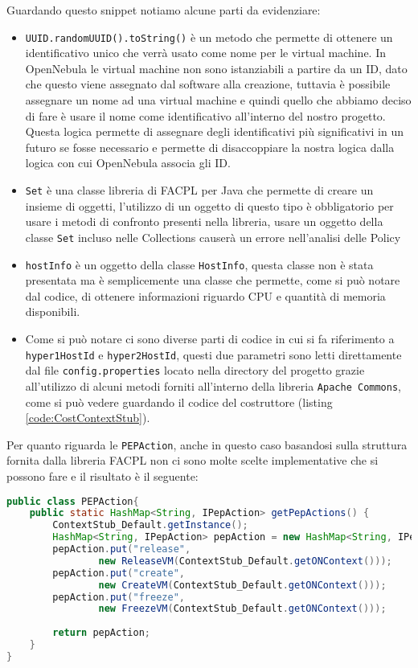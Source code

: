 Guardando questo snippet notiamo alcune parti da evidenziare:\\
\begin{itemize}
    \item \texttt{UUID.randomUUID().toString()} è un metodo che permette di ottenere un identificativo unico che verrà usato come nome per le virtual machine. In OpenNebula le virtual machine non sono istanziabili a partire da un ID, dato che questo viene assegnato dal software alla creazione, tuttavia è possibile assegnare un nome ad una virtual machine e quindi quello che abbiamo deciso di fare è usare il nome come identificativo all'interno del nostro progetto. Questa logica permette di assegnare degli identificativi più significativi in un futuro se fosse necessario e permette di disaccoppiare la nostra logica dalla logica con cui OpenNebula associa gli ID.
    \item \texttt{Set} è una classe libreria di FACPL per Java che permette di creare un insieme di oggetti, l'utilizzo di un oggetto di questo tipo è obbligatorio per usare i metodi di confronto presenti nella libreria, usare un oggetto della classe \texttt{Set} incluso nelle Collections causerà un errore nell'analisi delle Policy
    \item \texttt{hostInfo} è un oggetto della classe \texttt{HostInfo}, questa classe non è stata presentata ma è semplicemente una classe che permette, come si può notare dal codice, di ottenere informazioni riguardo CPU e quantità di memoria disponibili.
    \item Come si può notare ci sono diverse parti di codice in cui si fa riferimento a \texttt{hyper1HostId} e \texttt{hyper2HostId}, questi due parametri sono letti direttamente dal file \texttt{config.properties} locato nella directory del progetto grazie all'utilizzo di alcuni metodi forniti all'interno della libreria \texttt{Apache Commons}\cite{apache_commons}, come si può vedere guardando il codice del costruttore (listing \ref{code:CostContextStub}).
\end{itemize}

Per quanto riguarda le \texttt{PEPAction}, anche in questo caso basandosi sulla struttura fornita dalla libreria FACPL non ci sono molte scelte implementative che si possono fare e il risultato è il seguente:
\begin{lstlisting}[language=Java, caption=Classe PEPAction adattata, label=code:PEPAction]
public class PEPAction{
    public static HashMap<String, IPepAction> getPepActions() {
        ContextStub_Default.getInstance();
        HashMap<String, IPepAction> pepAction = new HashMap<String, IPepAction>();
        pepAction.put("release", 
                new ReleaseVM(ContextStub_Default.getONContext()));
        pepAction.put("create", 
                new CreateVM(ContextStub_Default.getONContext()));
        pepAction.put("freeze", 
                new FreezeVM(ContextStub_Default.getONContext()));
        
        return pepAction;
    }
}
\end{lstlisting}

